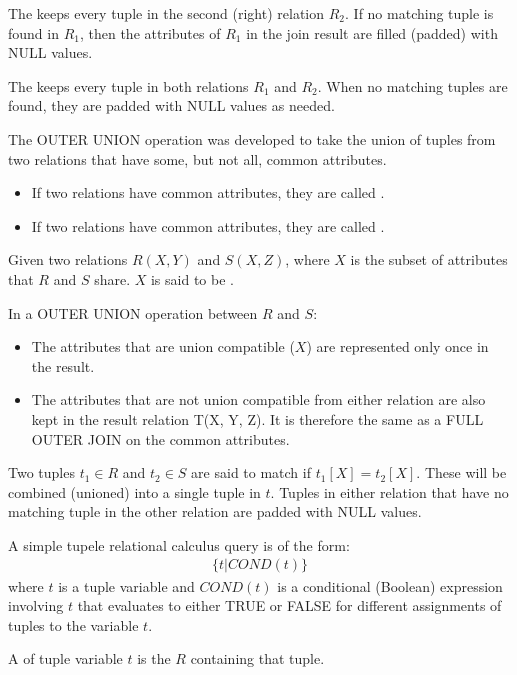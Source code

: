       \par The  keeps every tuple in the second (right) relation $R_2$. If no matching tuple is found in $R_1$, then the attributes of $R_1$ in the join result are filled (padded) with NULL values.

      \par The  keeps every tuple in both relations $R_1$ and $R_2$. When no
matching tuples are found, they are padded with NULL values as needed.

    \par The OUTER UNION operation was developed to take the union of tuples from two relations that have some, but not all, common attributes.
    \begin{itemize}
      \item If two relations have  common attributes, they are called .
      \item If two relations have  common attributes, they are called .
    \end{itemize}

    \par Given two relations $R(X, Y)$ and $S(X, Z)$, where $X$ is the subset of attributes that $R$ and $S$ share. $X$ is said to be .

    \par In a OUTER UNION operation between $R$ and $S$:

    \begin{itemize}
      \item The attributes that are union compatible ($X$) are represented only once in the result.
      \item The attributes that are not union compatible from either relation are also kept in the result relation T(X, Y, Z). It is therefore the same as a FULL OUTER JOIN on the common attributes.
    \end{itemize}

    \par Two tuples $t_1 \in R$ and $t_2 \in S$ are said to match if $t_1[X] = t_2[X]$. These will be combined (unioned) into a single tuple in $t$. Tuples in either relation that have no matching tuple in the other relation are padded with NULL values.

      \par A simple tupele relational calculus query is of the form:
      \begin{align*}
        \{t | COND(t)\}
      \end{align*}
      where $t$ is a tuple variable and $COND(t)$ is a conditional (Boolean) expression involving $t$ that evaluates to either TRUE or FALSE for different assignments of tuples to the variable $t$.

      \par A  of tuple variable $t$ is the  $R$ containing that tuple.
